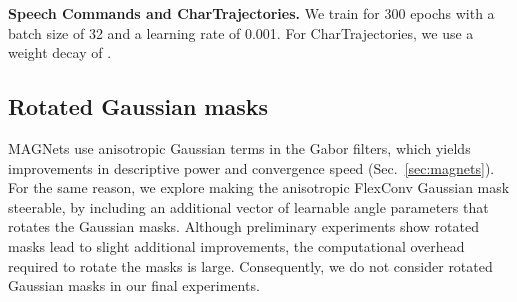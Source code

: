 \documentclass{article} \usepackage{iclr2022_conference,times}
\begin{document}
\textbf{Speech Commands and CharTrajectories.} We train for 300 epochs with a batch size of 32 and a learning rate of 0.001. For CharTrajectories, we use a weight decay of .

\subsection{Rotated Gaussian masks}
\label{sec:negative-steerable-gaussians}

MAGNets use anisotropic Gaussian terms in the Gabor filters, which yields improvements in descriptive power and convergence speed (Sec.~\ref{sec:magnets}). For the same reason, we explore making the anisotropic FlexConv Gaussian mask steerable, by including an additional vector of learnable angle parameters  that rotates the Gaussian masks. Although preliminary experiments show rotated masks lead to slight additional improvements, the computational overhead required to rotate the masks is large. Consequently, we do not consider rotated Gaussian masks in our final experiments.
\end{document}
